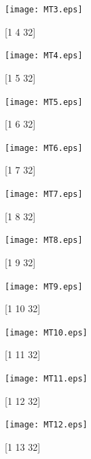 \documentclass{article}
\begin{document}
		\begin{figure}[H]
			\begin{minipage}[t]{0.5\textwidth}
				\centering
				\texttt{[image: MT3.eps]}
				\caption{[1 4 32]}
			\end{minipage}%
			\begin{minipage}[t]{1.0\textwidth}
				\centering
				\texttt{[image: MT4.eps]}
				\caption{[1 5 32]}
			\end{minipage}
		\end{figure}
			\begin{figure}[H]
				\begin{minipage}[t]{0.5\textwidth}
					\centering
					\texttt{[image: MT5.eps]}
					\caption{[1 6 32]}
				\end{minipage}%
				\begin{minipage}[t]{1.0\textwidth}
					\centering
					\texttt{[image: MT6.eps]}
					\caption{[1 7 32]}
				\end{minipage}
			\end{figure}
				\begin{figure}[H]
					\begin{minipage}[t]{0.5\textwidth}
						\centering
						\texttt{[image: MT7.eps]}
						\caption{[1 8 32]}
					\end{minipage}%
					\begin{minipage}[t]{1.0\textwidth}
						\centering
						\texttt{[image: MT8.eps]}
						\caption{[1 9 32]}
					\end{minipage}
				\end{figure}
					\begin{figure}[H]
						\begin{minipage}[t]{0.5\textwidth}
							\centering
							\texttt{[image: MT9.eps]}
							\caption{[1 10 32]}
						\end{minipage}%
						\begin{minipage}[t]{1.0\textwidth}
							\centering
							\texttt{[image: MT10.eps]}
							\caption{[1 11 32]}
						\end{minipage}
					\end{figure}
						\begin{figure}[H]
							\begin{minipage}[t]{0.5\textwidth}
								\centering
							\texttt{[image: MT11.eps]}
								\caption{[1 12 32]}
							\end{minipage}%
							\begin{minipage}[t]{1.0\textwidth}
								\centering
							\texttt{[image: MT12.eps]}
								\caption{[1 13 32]}
							\end{minipage}
						\end{figure}
\end{document}

